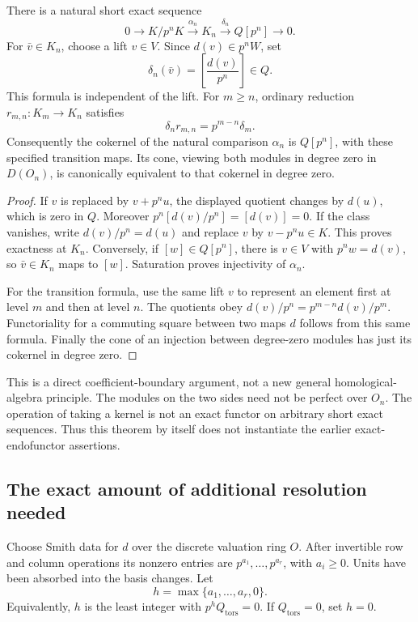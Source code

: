 \begin{theorem}\label{thm:kernel-bockstein}
There is a natural short exact sequence
\[
 \boxed{0\longrightarrow K/p^nK\xrightarrow{\alpha_n}K_n
 \xrightarrow{\delta_n}Q[p^n]\longrightarrow0.}
\]
For $\bar v\in K_n$, choose a lift $v\in V$. Since $d(v)\in p^nW$, set
\[
 \delta_n(\bar v)=\left[\frac{d(v)}{p^n}\right]\in Q.
\]
This formula is independent of the lift. For $m\geq n$, ordinary reduction $r_{m,n}:K_m\to K_n$ satisfies
\[
 \boxed{\delta_n r_{m,n}=p^{m-n}\delta_m.}
\]
Consequently the cokernel of the natural comparison $\alpha_n$ is $Q[p^n]$, with these specified transition maps. Its cone, viewing both modules in degree zero in $D(O_n)$, is canonically equivalent to that cokernel in degree zero.
\end{theorem}
\begin{proof}
If $v$ is replaced by $v+p^n u$, the displayed quotient changes by $d(u)$, which is zero in $Q$. Moreover $p^n[d(v)/p^n]=[d(v)]=0$. If the class vanishes, write $d(v)/p^n=d(u)$ and replace $v$ by $v-p^n u\in K$. This proves exactness at $K_n$. Conversely, if $[w]\in Q[p^n]$, there is $v\in V$ with $p^n w=d(v)$, so $\bar v\in K_n$ maps to $[w]$. Saturation proves injectivity of $\alpha_n$.

For the transition formula, use the same lift $v$ to represent an element first at level $m$ and then at level $n$. The quotients obey $d(v)/p^n=p^{m-n}d(v)/p^m$. Functoriality for a commuting square between two maps $d$ follows from this same formula. Finally the cone of an injection between degree-zero modules has just its cokernel in degree zero.
\end{proof}

This is a direct coefficient-boundary argument, not a new general homological-algebra principle. The modules on the two sides need not be perfect over $O_n$. The operation of taking a kernel is not an exact functor on arbitrary short exact sequences. Thus this theorem by itself does not instantiate the earlier exact-endofunctor assertions.

\subsection{The exact amount of additional resolution needed}

Choose Smith data for $d$ over the discrete valuation ring $O$. After invertible row and column operations its nonzero entries are $p^{a_1},\ldots,p^{a_r}$, with $a_i\geq0$. Units have been absorbed into the basis changes. Let
\[
 h=\max\{a_1,\ldots,a_r,0\}.
\]
Equivalently, $h$ is the least integer with $p^h Q_{\mathrm{tors}}=0$. If $Q_{\mathrm{tors}}=0$, set $h=0$.

